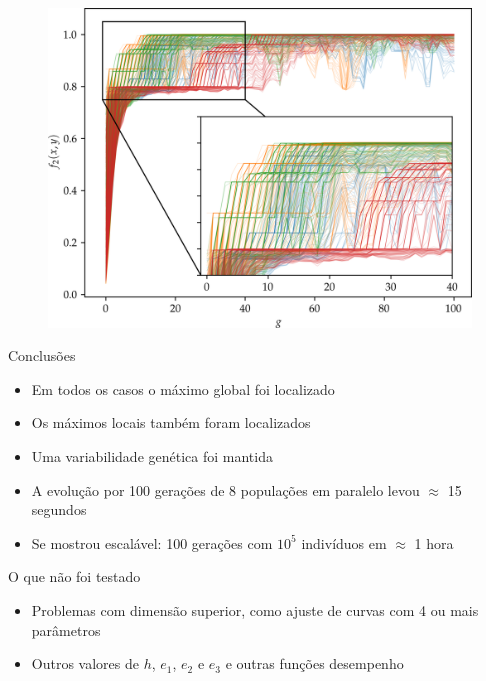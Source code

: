 \begin{frame}
  \begin{figure}
    \centering
    \includegraphics[height=0.95\textheight]{imagens/high_prob/evolution_near_gaussians.png}
  \end{figure}
\end{frame}

\begin{frame}
  \begin{block}{Conclusões}
    \begin{itemize}
      \item Em todos os casos o máximo global foi localizado
      \item Os máximos locais também foram localizados
      \item Uma variabilidade genética foi mantida
      \item A evolução por 100 gerações de 8 populações em paralelo
            levou $\approx$ 15 segundos
      \item Se mostrou escalável: 100 gerações com $10^5$ indivíduos
            em $\approx$ 1 hora
    \end{itemize}
  \end{block}
  \begin{alertblock}{O que não foi testado}
    \begin{itemize}
      \item Problemas com dimensão superior, como ajuste de curvas
            com 4 ou mais parâmetros
      \item Outros valores de $h$, $e_1$, $e_2$ e $e_3$ e outras funções desempenho
    \end{itemize}
  \end{alertblock}
\end{frame}

